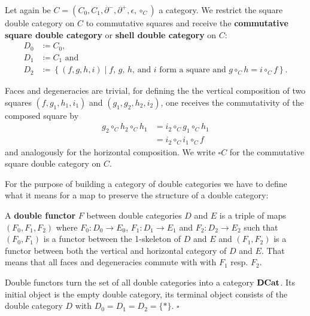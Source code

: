 \begin{example} \label{def:shell-dbl-cat}
Let again be $C = (C_0, C_1, \partial^-, \partial^+, \epsilon, \circ_C)$ a category.
We restrict the square double category on $C$ to commutative squares and receive
the \textbf{commutative square double category} or \textbf{shell double category}
on $C$:
\begin{align*}
D_0 &\coloneqq C_0 \text{,} \\
D_1 &\coloneqq C_1 \text{ and } \\
D_2 &\coloneqq \left\{ (f, g, h, i) \middle| \text{$f$, $g$, $h$, and $i$ form a
	 square and } g \circ_C h = i \circ_C f \right\} \text{.}
\end{align*}

Faces and degeneracies are trivial, for defining the the vertical composition of
two squares $(f, g_1, h_1, i_1)$ and $(g_1, g_2, h_2, i_2)$, one receives the
commutativity of the composed square by
\begin{align*}
g_2 \circ_C h_2 \circ_C h_1 &= i_2 \circ_C g_1 \circ_C h_1 \\
	&= i_2 \circ_C i_1 \circ_C f
\end{align*}
and analogously for the horizontal composition. We write $\square C$ for the
commutative square double category on $C$.
\end{example}

For the purpose of building a category of double categories we have to define what
it means for a map to preserve the structure of a double category:

\begin{defn} \label{def:dbl-functor}
A \textbf{double functor} $F$ between double categories $D$ and $E$ is a triple of maps
$(F_0, F_1, F_2)$ where $F_0 : D_0 \to E_0$, $F_1 : D_1 \to E_1$ and $F_2 : D_2
\to E_2$ such that $(F_0,F_1)$ is a functor between the 1-skeleton of $D$ and $E$
and $(F_1,F_2)$ is a functor between both the vertical and horizontal category
of $D$ and $E$. That means that all faces and degeneracies commute with with $F_1$
resp. $F_2$.
\end{defn}

\begin{lemma} \label{def:cat-of-dbl-cat}
Double functors turn the set of all double categories into a category $\mathbf{DCat}$.
Its initial object is the empty double category, its terminal object consists of the
double category $D$ with $D_0 = D_1 = D_2 = \{\ast\}$.
\hfill $\square$
\end{lemma}

